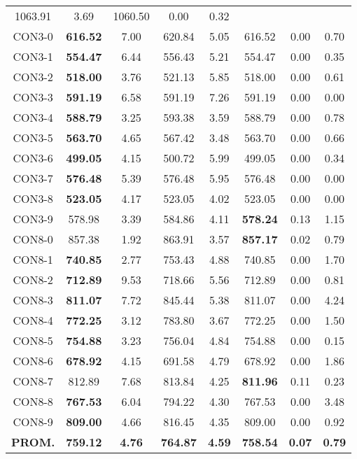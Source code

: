 \begin{table}[h]
\begin{tabular}{c c c c c c c c}
1063.91 & 3.69 & 1060.50 & 0.00
 & 0.32\\CON3-0 & \bf{616.52} & 7.00 & 
620.84 & 5.05 & 616.52 & 0.00
 & 0.70\\CON3-1 & \bf{554.47} & 6.44 & 
556.43 & 5.21 & 554.47 & 0.00
 & 0.35\\CON3-2 & \bf{518.00} & 3.76 & 
521.13 & 5.85 & 518.00 & 0.00
 & 0.61\\CON3-3 & \bf{591.19} & 6.58 & 
591.19 & 7.26 & 591.19 & 0.00
 & 0.00\\
CON3-4 & \bf{588.79} & 3.25 & 
593.38 & 3.59 & 588.79 & 0.00
 & 0.78\\CON3-5 & \bf{563.70} & 4.65 & 
567.42 & 3.48 & 563.70 & 0.00
 & 0.66\\CON3-6 & \bf{499.05} & 4.15 & 
500.72 & 5.99 & 499.05 & 0.00
 & 0.34\\CON3-7 & \bf{576.48} & 5.39 & 
576.48 & 5.95 & 576.48 & 0.00
 & 0.00\\
CON3-8 & \bf{523.05} & 4.17 & 
523.05 & 4.02 & 523.05 & 0.00
 & 0.00\\
CON3-9 & 578.98 & 3.39 & 
584.86 & 4.11 & \bf{578.24} & 
0.13 & 1.15\\CON8-0 & 857.38 & 1.92 & 
863.91 & 3.57 & \bf{857.17} & 
0.02 & 0.79\\CON8-1 & \bf{740.85} & 2.77 & 
753.43 & 4.88 & 740.85 & 0.00
 & 1.70\\CON8-2 & \bf{712.89} & 9.53 & 
718.66 & 5.56 & 712.89 & 0.00
 & 0.81\\CON8-3 & \bf{811.07} & 7.72 & 
845.44 & 5.38 & 811.07 & 0.00
 & 4.24\\CON8-4 & \bf{772.25} & 3.12 & 
783.80 & 3.67 & 772.25 & 0.00
 & 1.50\\CON8-5 & \bf{754.88} & 3.23 & 
756.04 & 4.84 & 754.88 & 0.00
 & 0.15\\CON8-6 & \bf{678.92} & 4.15 & 
691.58 & 4.79 & 678.92 & 0.00
 & 1.86\\CON8-7 & 812.89 & 7.68 & 
813.84 & 4.25 & \bf{811.96} & 
0.11 & 0.23\\CON8-8 & \bf{767.53} & 6.04 & 
794.22 & 4.30 & 767.53 & 0.00
 & 3.48\\CON8-9 & \bf{809.00} & 4.66 & 
816.45 & 4.35 & 809.00 & 0.00
 & 0.92\\\bf{PROM.} & 
\bf{759.12} & \bf{4.76} & \bf{764.87} & \bf{4.59} & \bf{758.54} & \bf{0.07} & \bf{0.79}\\[1ex]\hline
\end{tabular}
\label{table:nonlin}
\end{table}
